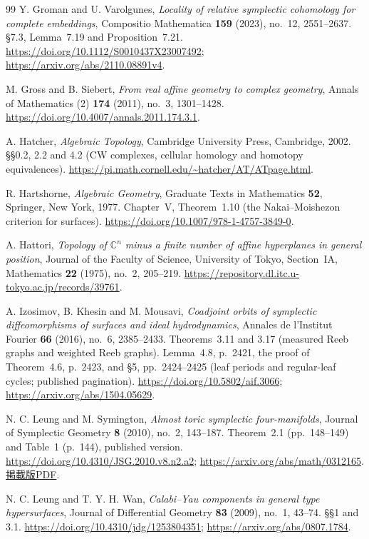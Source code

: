 \begin{thebibliography}{99}
Y. Groman and U. Varolgunes,
\emph{Locality of relative symplectic cohomology for complete embeddings},
Compositio Mathematica \textbf{159} (2023), no.~12, 2551--2637.
\S7.3, Lemma~7.19 and Proposition~7.21.
\url{https://doi.org/10.1112/S0010437X23007492};
\url{https://arxiv.org/abs/2110.08891v4}.

M. Gross and B. Siebert,
\emph{From real affine geometry to complex geometry},
Annals of Mathematics (2) \textbf{174} (2011), no.~3, 1301--1428.
\url{https://doi.org/10.4007/annals.2011.174.3.1}.

A. Hatcher,
\emph{Algebraic Topology},
Cambridge University Press, Cambridge, 2002.
\S\S0.2, 2.2 and 4.2 (CW complexes, cellular homology and homotopy equivalences).
\url{https://pi.math.cornell.edu/~hatcher/AT/ATpage.html}.

R. Hartshorne,
\emph{Algebraic Geometry},
Graduate Texts in Mathematics \textbf{52}, Springer, New York, 1977.
Chapter~V, Theorem~1.10 (the Nakai--Moishezon criterion for surfaces).
\url{https://doi.org/10.1007/978-1-4757-3849-0}.

A. Hattori,
\emph{Topology of $\mathbb C^n$ minus a finite number of affine hyperplanes in general position},
Journal of the Faculty of Science, University of Tokyo, Section~IA, Mathematics
\textbf{22} (1975), no.~2, 205--219.
\url{https://repository.dl.itc.u-tokyo.ac.jp/records/39761}.

A. Izosimov, B. Khesin and M. Mousavi,
\emph{Coadjoint orbits of symplectic diffeomorphisms of surfaces and ideal hydrodynamics},
Annales de l'Institut Fourier \textbf{66} (2016), no.~6, 2385--2433.
Theorems~3.11 and 3.17 (measured Reeb graphs and weighted Reeb graphs).
Lemma~4.8, p.~2421, the proof of Theorem~4.6, p.~2423,
and \S5, pp.~2424--2425 (leaf periods and regular-leaf cycles; published pagination).
\url{https://doi.org/10.5802/aif.3066};
\url{https://arxiv.org/abs/1504.05629}.

N. C. Leung and M. Symington,
\emph{Almost toric symplectic four-manifolds},
Journal of Symplectic Geometry \textbf{8} (2010), no.~2, 143--187.
Theorem~2.1 (pp.~148--149) and Table~1 (p.~144), published version.
\url{https://doi.org/10.4310/JSG.2010.v8.n2.a2};
\url{https://arxiv.org/abs/math/0312165}.
\href{https://archive.ymsc.tsinghua.edu.cn/pacm_download/60/558-2010_Leung_Symington_Almost_Toric_Sympl_Mfd_JSG.pdf}{掲載版PDF}.

N. C. Leung and T. Y. H. Wan,
\emph{Calabi--Yau components in general type hypersurfaces},
Journal of Differential Geometry \textbf{83} (2009), no.~1, 43--74.
\S\S1 and 3.1.
\url{https://doi.org/10.4310/jdg/1253804351};
\url{https://arxiv.org/abs/0807.1784}.


\end{thebibliography}
